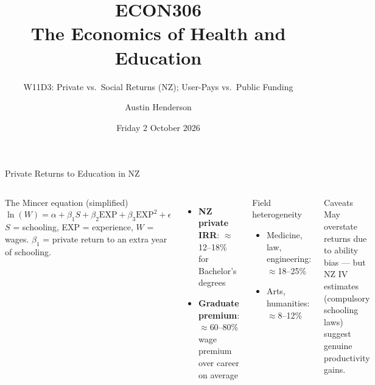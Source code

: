\documentclass[aspectratio=169, 12pt]{beamer}
\title[ECON306: W11D3 — Private vs. Social Returns]{ECON306\\The Economics of Health and Education}
\subtitle{W11D3: Private vs.\ Social Returns (NZ); User-Pays vs.\ Public Funding}
\author{Austin Henderson}
\institute{Department of Economics\\University of Otago}
\date{Friday 2 October 2026}
\begin{document}
\begin{frame}[plain]
  \titlepage
\end{frame}



\begin{frame}{Private Returns to Education in NZ}
  \begin{columns}
      \begin{block}{The Mincer equation (simplified)}
        \footnotesize $\ln(W) = \alpha + \beta_1 S + \beta_2 \text{EXP} + \beta_3 \text{EXP}^2 + \epsilon$\\[0.15em]
        $S$ = schooling, EXP = experience, $W$ = wages. $\beta_1$ = private return to an extra year of schooling.
      \end{block}
      \vspace{0.15em}
      \footnotesize
      \begin{itemize}
        \item \textbf{NZ private IRR}: $\approx$12--18\% for Bachelor's degrees
        \item \textbf{Graduate premium}: $\approx$60--80\% wage premium over career on average
      \end{itemize}
      \begin{exampleblock}{Field heterogeneity}
        \footnotesize
        \begin{itemize}
          \item Medicine, law, engineering: $\approx$18--25\%
          \item Arts, humanities: $\approx$8--12\%
        \end{itemize}
      \end{exampleblock}
      \vspace{0.2em}
      \begin{alertblock}{Caveats}
        \footnotesize May overstate returns due to ability bias --- but NZ IV estimates (compulsory schooling laws) suggest genuine productivity gains.
      \end{alertblock}
  \end{columns}
\end{frame}
\end{document}
